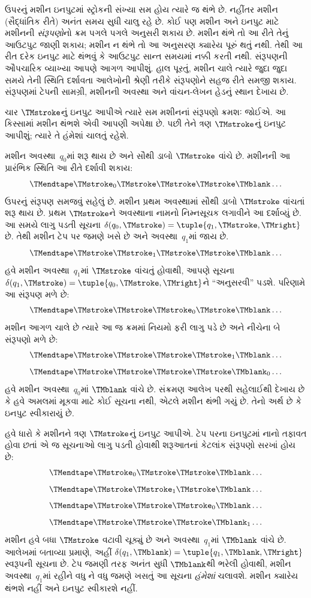 \documentclass[../../../include/open-logic-section]{subfiles}
\begin{document}
\begin{explain}
ઉપરનું મશીન ઇનપુટમાં સ્ટ્રોકની સંખ્યા સમ હોય ત્યારે
જ થંભે છે. નહીંતર મશીન (સૈદ્ધાંતિક રીતે) અનંત સમય સુધી
ચાલુ રહે છે. કોઈ પણ મશીન અને ઇનપુટ માટે મશીનની
\emph{સંરૂપણો}નો ક્રમ પગલે પગલે અનુસરી શકાય છે. મશીન
થંભે તો આ રીતે તેનું આઉટપુટ જાણી શકાય; મશીન ન થંભે
તો આ અનુસરણ ક્યારેય પૂરું થતું નથી. તેથી આ રીત દરેક
ઇનપુટ માટે થંભવું કે આઉટપુટ સાન્ત સમયમાં નક્કી કરતી નથી.
સંરૂપણની ઔપચારિક વ્યાખ્યા આપણે આગળ આપીશું. હાલ પૂરતું,
મશીન ચાલે ત્યારે જુદા જુદા સમયે તેની સ્થિતિ દર્શાવતા આલેખોની
શ્રેણી તરીકે સંરૂપણોને સહજ રીતે સમજી શકાય. સંરૂપણમાં ટેપની
સામગ્રી, મશીનની અવસ્થા અને વાંચન-લેખન હેડનું સ્થાન દેખાય છે.

ચાર $\TMstroke$નું ઇનપુટ આપીએ ત્યારે સમ મશીનનાં સંરૂપણો
ક્રમશઃ જોઈએ. આ કિસ્સામાં મશીન થંભશે એવી આપણી અપેક્ષા
છે. પછી તેને ત્રણ $\TMstroke$નું ઇનપુટ આપીશું; ત્યારે તે
હંમેશાં ચાલતું રહેશે.

મશીન અવસ્થા~$q_0$માં શરૂ થાય છે અને સૌથી ડાબો
$\TMstroke$ વાંચે છે. મશીનની આ પ્રારંભિક સ્થિતિ આ રીતે
દર્શાવી શકાય:
\[
\TMendtape \TMstroke_0 \TMstroke \TMstroke \TMstroke \TMblank \ldots
\]
ઉપરનું સંરૂપણ સમજવું સહેલું છે. મશીન પ્રથમ અવસ્થામાં
સૌથી ડાબો $\TMstroke$ વાંચતાં શરૂ થાય છે. પ્રથમ
$\TMstroke$ને અવસ્થાના નામનો નિમ્નસૂચક લગાવીને આ દર્શાવ્યું
છે. આ સમયે લાગુ પડતી સૂચના
$\delta(q_0, \TMstroke) = \tuple{q_1, \TMstroke, \TMright}$
છે. તેથી મશીન ટેપ પર જમણે ખસે છે અને અવસ્થા~$q_1$માં
જાય છે.
\[
\TMendtape \TMstroke \TMstroke_1 \TMstroke \TMstroke \TMblank \ldots
\]
હવે મશીન અવસ્થા~$q_1$માં $\TMstroke$ વાંચતું હોવાથી,
આપણે સૂચના $\delta(q_1, \TMstroke) = \tuple{q_0,
  \TMstroke, \TMright}$ને ``અનુસરવી'' પડશે. પરિણામે આ
સંરૂપણ મળે છે:
\[
\TMendtape \TMstroke \TMstroke \TMstroke_0 \TMstroke \TMblank \ldots
\]
મશીન આગળ ચાલે છે ત્યારે આ જ ક્રમમાં નિયમો ફરી લાગુ પડે
છે અને નીચેના બે સંરૂપણો મળે છે:
\[
\TMendtape \TMstroke \TMstroke \TMstroke \TMstroke_1 \TMblank \ldots
\]
\[
\TMendtape \TMstroke \TMstroke \TMstroke \TMstroke \TMblank_0 \ldots
\]
હવે મશીન અવસ્થા~$q_0$માં $\TMblank$ વાંચે છે. સંક્રમણ
આલેખ પરથી સહેલાઈથી દેખાય છે કે હવે અમલમાં મૂકવા માટે કોઈ
સૂચના નથી, એટલે મશીન થંભી ગયું છે. તેનો અર્થ છે કે
ઇનપુટ સ્વીકારાયું છે.

હવે ધારો કે મશીનને ત્રણ $\TMstroke$નું ઇનપુટ આપીએ.
ટેપ પરના ઇનપુટમાં નાનો તફાવત હોવા છતાં એ જ સૂચનાઓ લાગુ
પડતી હોવાથી શરૂઆતનાં કેટલાંક સંરૂપણો સરખાં હોય છે:
\[
\TMendtape \TMstroke_0 \TMstroke \TMstroke \TMblank \ldots
\]
\[
\TMendtape \TMstroke \TMstroke_1 \TMstroke \TMblank \ldots
\]
\[
\TMendtape \TMstroke \TMstroke \TMstroke_0 \TMblank \ldots
\]
\[
\TMendtape \TMstroke \TMstroke \TMstroke \TMblank_1 \ldots
\]
મશીન હવે બધા $\TMstroke$ વટાવી ચૂક્યું છે અને
અવસ્થા~$q_1$માં $\TMblank$ વાંચે છે. આલેખમાં બતાવ્યા
પ્રમાણે, અહીં $\delta(q_1, \TMblank) =\tuple{q_1,
\TMblank, \TMright}$ સ્વરૂપની સૂચના છે. ટેપ જમણી તરફ
અનંત સુધી $\TMblank$થી ભરેલી હોવાથી, મશીન
અવસ્થા~$q_1$માં રહીને વધુ ને વધુ જમણે ખસતું આ સૂચના
\emph{હંમેશાં} ચલાવશે. મશીન ક્યારેય થંભશે નહીં અને ઇનપુટ
સ્વીકારશે નહીં.
\end{explain}
\end{document}
